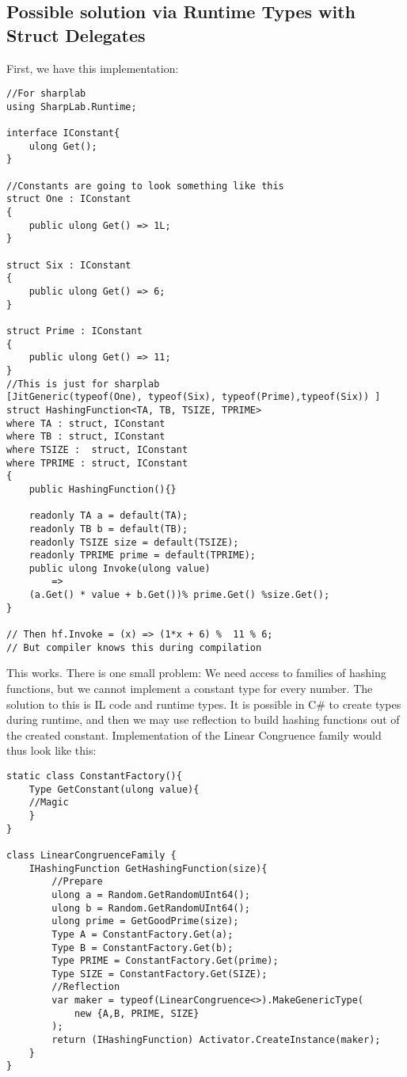 \subsection{Possible solution via Runtime Types with Struct Delegates}
First, we have this implementation:
\begin{lstlisting}
//For sharplab
using SharpLab.Runtime; 

interface IConstant{
    ulong Get();
}

//Constants are going to look something like this
struct One : IConstant
{
    public ulong Get() => 1L; 
}

struct Six : IConstant
{
    public ulong Get() => 6; 
}

struct Prime : IConstant
{
    public ulong Get() => 11; 
}
//This is just for sharplab
[JitGeneric(typeof(One), typeof(Six), typeof(Prime),typeof(Six)) ]
struct HashingFunction<TA, TB, TSIZE, TPRIME> 
where TA : struct, IConstant
where TB : struct, IConstant
where TSIZE :  struct, IConstant
where TPRIME : struct, IConstant
{
    public HashingFunction(){}
    
    readonly TA a = default(TA);
    readonly TB b = default(TB);
    readonly TSIZE size = default(TSIZE);
    readonly TPRIME prime = default(TPRIME);
    public ulong Invoke(ulong value) 
        => 
    (a.Get() * value + b.Get())% prime.Get() %size.Get();
} 

// Then hf.Invoke = (x) => (1*x + 6) %  11 % 6;
// But compiler knows this during compilation
\end{lstlisting}
This works. There is one small problem: We need access to families of hashing functions, but we cannot implement a constant type for every number. The solution to this is IL code and runtime types. It is possible in C\# to create types during runtime, and then we may use reflection to build hashing functions out of the created constant. Implementation of the Linear Congruence family would thus look like this:

\begin{lstlisting}
static class ConstantFactory(){
    Type GetConstant(ulong value){
    //Magic
    }
}

class LinearCongruenceFamily {
    IHashingFunction GetHashingFunction(size){
        //Prepare
        ulong a = Random.GetRandomUInt64();
        ulong b = Random.GetRandomUInt64();
        ulong prime = GetGoodPrime(size);
        Type A = ConstantFactory.Get(a);
        Type B = ConstantFactory.Get(b);
        Type PRIME = ConstantFactory.Get(prime);
        Type SIZE = ConstantFactory.Get(SIZE);
        //Reflection
        var maker = typeof(LinearCongruence<>).MakeGenericType(
            new {A,B, PRIME, SIZE}
        );
        return (IHashingFunction) Activator.CreateInstance(maker);
    }
}
\end{lstlisting}

